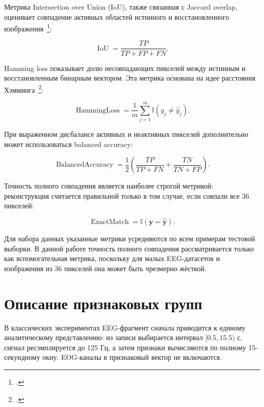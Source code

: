 Метрика Intersection over Union (IoU), также связанная с Jaccard overlap, оценивает совпадение активных областей истинного и восстановленного изображения~\footcite{10.1186/s12880-015-0068-x}:

\begin{equation}
\operatorname{IoU} =
\frac{TP}{TP + FP + FN}.
\end{equation}

Hamming loss показывает долю несовпадающих пикселей между истинным и восстановленным бинарным вектором. Эта метрика основана на идее расстояния Хэмминга~\footcite{10.1002/j.1538-7305.1950.tb00463.x}:

\begin{equation}
\operatorname{HammingLoss} =
\frac{1}{m}\sum_{j=1}^{m}\mathbb{I}(y_j \ne \hat{y}_j).
\end{equation}

При выраженном дисбалансе активных и неактивных пикселей дополнительно может использоваться balanced accuracy:

\begin{equation}
\operatorname{BalancedAccuracy} =
\frac{1}{2}
\left(
\frac{TP}{TP + FN} +
\frac{TN}{TN + FP}
\right).
\end{equation}

Точность полного совпадения является наиболее строгой метрикой: реконструкция
считается правильной только в том случае, если совпали все 36 пикселей:

\begin{equation}
\operatorname{ExactMatch} =
\mathbb{I}(\mathbf{y} = \hat{\mathbf{y}}).
\end{equation}

Для набора данных указанные метрики усредняются по всем примерам тестовой
выборки. В данной работе точность полного совпадения рассматривается только
как вспомогательная метрика, поскольку для малых EEG-датасетов и изображения
из 36 пикселей она может быть чрезмерно жёсткой.

\section*{Описание признаковых групп}
\label{app:feature-groups}

В классических экспериментах EEG-фрагмент сначала приводится к единому
аналитическому представлению: из записи выбирается интервал $[0.5, 15.5)$
с, сигнал ресэмплируется до 125 Гц, а затем признаки вычисляются по полному
15-секундному окну. EOG-каналы в признаковый вектор не включаются.

